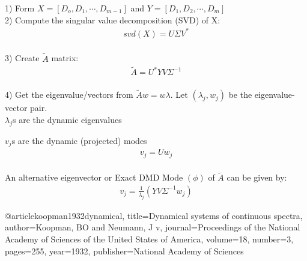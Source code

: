 \documentclass{article}
\begin{document}
1) Form $X=[D_o,D_1, \cdots ,D_{m-1}]$ and $Y=[D_1,D_2, \cdots,D_m]$\\

2) Compute the singular value decomposition (SVD) of X:
\begin{align*}
svd(X) = U\Sigma V^*
\end{align*}\\

3) Create $\tilde{A}$ matrix:
\begin{align*}
\tilde{A}=U^*YV\Sigma ^{-1}
\end{align*}\\

4) Get the eigenvalue/vectors from $\tilde{A}w=w\lambda$. Let $(\lambda_j,w_j)$ be the eigenvalue-vector pair.\\

$\lambda_j$s are the dynamic eigenvalues\

$v_j$s are the dynamic (projected) modes\\

\begin{align*}
v_j=Uw_j
\end{align*}\\

An alternative eigenvector or Exact DMD Mode $(\phi)$ of $\tilde{A}$ can be given by:
\begin{align*}
v_j = \frac{1}{\lambda_j}(YV\Sigma^{-1}w_j)
\end{align*}


@article{koopman1932dynamical,
  title={Dynamical systems of continuous spectra},
  author={Koopman, BO and Neumann, J v},
  journal={Proceedings of the National Academy of Sciences of the United States of America},
  volume={18},
  number={3},
  pages={255},
  year={1932},
  publisher={National Academy of Sciences}
}
\end{document}
